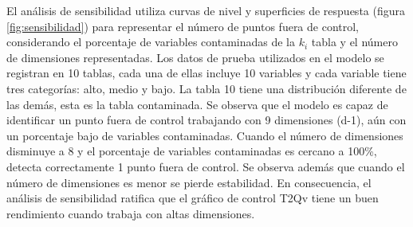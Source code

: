 \documentclass[water,article,submit,moreauthors,pdftex]{mdpi}
\begin{document}
El análisis de sensibilidad utiliza curvas de nivel y superficies de
respuesta (figura \ref{fig:sensibilidad}) para representar el número de
puntos fuera de control, considerando el porcentaje de variables
contaminadas de la \(k_i\) tabla y el número de dimensiones
representadas. Los datos de prueba utilizados en el modelo se registran
en 10 tablas, cada una de ellas incluye 10 variables y cada variable
tiene tres categorías: alto, medio y bajo. La tabla 10 tiene una
distribución diferente de las demás, esta es la tabla contaminada. Se
observa que el modelo es capaz de identificar un punto fuera de control
trabajando con 9 dimensiones (d-1), aún con un porcentaje bajo de
variables contaminadas. Cuando el número de dimensiones disminuye a 8 y
el porcentaje de variables contaminadas es cercano a 100\%, detecta
correctamente 1 punto fuera de control. Se observa además que cuando el
número de dimensiones es menor se pierde estabilidad. En consecuencia,
el análisis de sensibilidad ratifica que el gráfico de control T2Qv
tiene un buen rendimiento cuando trabaja con altas dimensiones.

%

\vspace{6pt}








\end{document}
